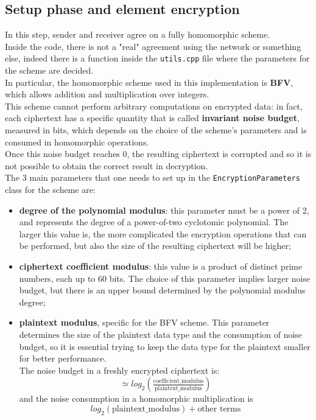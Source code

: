 \documentclass[10pt]{extarticle}
\begin{document}
\subsection{Setup phase and element encryption}
In this step, sender and receiver agree on a fully homomorphic scheme.\\
Inside the code, there is not a "real" agreement using the network or something else, indeed there is a function inside the \texttt{utils.cpp} file where the parameters for the scheme are decided.\\ In particular, the homomorphic scheme used in this implementation is \textbf{BFV}, which allows addition and multiplication over integers.\\This scheme cannot perform arbitrary computations on encrypted data: in fact, each ciphertext has a specific quantity that is called \textbf{invariant noise budget}, measured in bits, which depends on the choice of the scheme's parameters and is consumed in homomorphic operations.\\Once this noise budget reaches 0, the resulting ciphertext is corrupted and so it is not possible to obtain the correct result in decryption.\\The 3 main parameters that one needs to set up in the \texttt{EncryptionParameters} class for the scheme are:
\begin{itemize}
	\item \textbf{degree of the polynomial modulus}: this parameter must be a power of 2, and represents the degree of a power-of-two cyclotomic polynomial. The larger this value is, the more complicated the encryption operations that can be performed, but also the size of the resulting ciphertext will be higher;
	\item \textbf{ciphertext coefficient modulus}: this value is a product of distinct prime numbers, each up to 60 bits. The choice of this parameter implies larger noise budget, but there is an upper bound determined by the polynomial modulus degree;
	\item \textbf{plaintext modulus}, specific for the BFV scheme. This parameter determines the size of the plaintext data type and the consumption of noise budget, so it is essential trying to keep the data type for the plaintext smaller for better performance.\\The noise budget in a freshly encrypted ciphertext is:
	\begin{equation}
		\simeq log_2(\tfrac{\text{coefficient\_modulus}}{\text{plaintext\_modulus}})
	\end{equation}
	and the noise consumption in a homomorphic multiplication is 
	\begin{equation}
		log_2(\text{plaintext\_modulus}) + \text{other terms}
	\end{equation}
\end{itemize}
\end{document}
